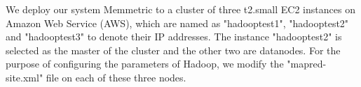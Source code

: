 We deploy our system Memmetric to a cluster of three t2.small EC2 instances on Amazon Web Service (AWS), which are named as "hadooptest1", "hadooptest2" and "hadooptest3" to denote their IP addresses.
The instance "hadooptest2" is selected as the master of the cluster and the other two are datanodes.
For the purpose of configuring the parameters of Hadoop, we modify the "mapred-site.xml" file on each of these three nodes.